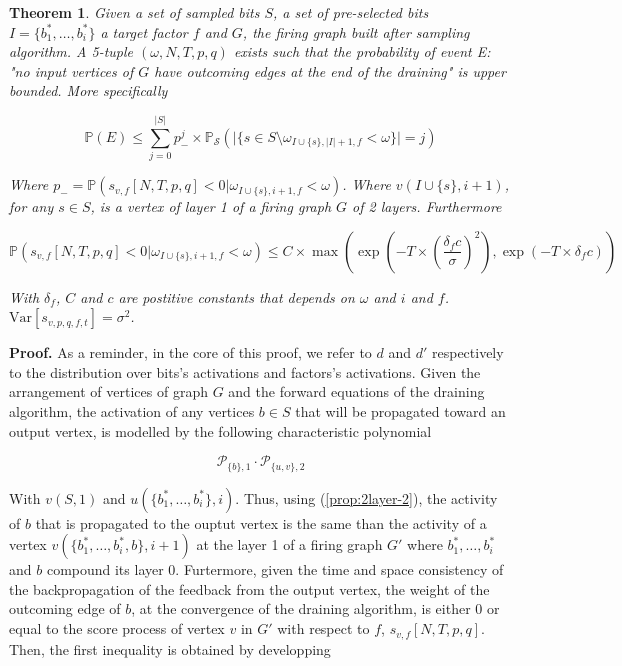 \documentclass[a4paper, 11pt]{article}
\newtheorem{theorem}{Theorem}[section]
\newcommand{\Var}{\mathrm{Var}}
\begin{document}
\begin{theorem}
\label{th_stopping}
Given a set of sampled bits $S$, a set of pre-selected bits $I =\{b_{1}^{*}, \ldots, b_{i}^{*}\}$ a target factor $f$ and $G$, the firing graph built after sampling algorithm. A 5-tuple $(\omega, N, T, p, q)$ exists such that the probability of event E: "no input vertices of $G$ have outcoming edges at the end of the draining" is upper bounded. More specifically

\begin{equation*}
\mathbb{P} \left( E \right) \leq \sum_{j = 0}^{\vert S \vert} p_{-}^j \times \mathbb{P}_{\mathcal{S}} \left( \vert \lbrace s \in S \setminus \omega_{I \cup \{s\}, \vert I \vert + 1, f } < \omega \rbrace \vert = j \right) 
\end{equation*}

Where $p_{-} = \mathbb{P} \left( s_{v, f}[N, T, p,q] < 0 \vert \omega_{I \cup \{ s \}, i + 1, f} < \omega \right)$. Where $v(I \cup \{ s \}, i+1)$, for any $s \in S$, is a vertex of layer 1 of a firing graph $G$ of 2 layers. Furthermore

\begin{equation*}
\mathbb{P} \left( s_{v, f}[N, T, p, q]< 0 \vert \omega_{I \cup \{ s \}, i + 1, f} < \omega \right) \leq C \times \max \left( \exp\left(- T \times \left(\frac{\delta_{f} c}{\sigma}\right)^2 \right), \exp\left(- T \times \delta_{f}c \right) \right)
\end{equation*}

With $\delta_{f}$, $C$ and $c$ are postitive constants that depends on $\omega$ and $i$ and $f$. $\Var[s_{v, p, q, f, t}] = \sigma^2$. 

\end{theorem}

\textbf{Proof.} As a reminder, in the core of this proof, we refer to $d$ and $d'$ respectively to the distribution over bits's activations and factors's activations. Given the arrangement of vertices of graph $G$ and the forward equations of the draining algorithm, the activation of any vertices $b \in S$ that will be propagated toward an output vertex, is modelled by the following characteristic polynomial

\begin{equation*}
\mathcal{P}_{\{b\}, 1} \cdot \mathcal{P}_{\{u, v\}, 2}
\end{equation*}

With $v(S, 1)$ and $u(\{b_1^{*}, \ldots, b_i^{*}\}, i)$. Thus, using (\ref{prop:2layer-2}), the activity of $b$ that is propagated to the ouptut vertex is the same than the activity of a vertex $v(\{b_1^{*}, \ldots, b_i^{*}, b\}, i+1)$ at the layer 1 of a firing graph $G'$ where $b_1^{*}, \ldots, b_i^{*}$ and $b$ compound its layer 0. Furtermore, given the time and space consistency of the backpropagation of the feedback from the output vertex, the weight of the outcoming edge of $b$, at the convergence of the draining algorithm, is either $0$ or equal to the score process of vertex $v$ in $G'$ with respect to $f$, $s_{v, f}[N, T, p, q]$. Then, the first inequality is obtained by developping
\end{document}
